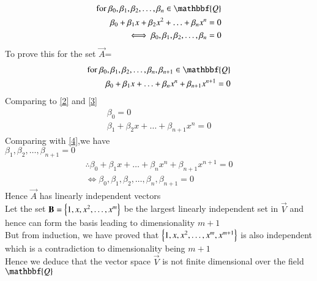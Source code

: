 \documentclass[journal,12pt,twocolumn]{IEEEtran}
\begin{document}
\begin{align}
\text{for  }\beta_0,\beta_1,\beta_2,\hdots,\beta_n \in \mathbbf{Q}\\
    \beta_0+\beta_1x+\beta_2x^2+\hdots+\beta_nx^n=0 \label{4}\\ \iff    \beta_0,\beta_1,\beta_2,\hdots,\beta_n=0
\end{align}
To prove this for the set $\vec{A}$=
\begin{align}
\text{for  }\beta_0,\beta_1,\beta_2,\hdots,\beta_n,\beta_{n+1} \in \mathbbf{Q}\\  
  \beta_0+\beta_1x+\hdots+\beta_nx^n+\beta_{n+1}x^{n+1}=0 
\end{align}
Comparing to \eqref{2} and \eqref{3}
\begin{align}
    \beta_0=0\\
    \beta_1+\beta_2x+\hdots+\beta_{n+1}x^n=0
\end{align}
Comparing with \eqref{4},we have\\
$\beta_1,\beta_2,\hdots,\beta_{n+1}=0$
\begin{align}
    \therefore  \beta_0+\beta_1x+\hdots+\beta_nx^n+\beta_{n+1}x^{n+1}=0 \\ \iff
    \beta_0,\beta_1,\beta_2,\hdots,\beta_n,\beta_{n+1}=0
\end{align}
Hence $\vec{A}$ has linearly independent vectors\\
Let the set $\mathbf{B} =\left\{1,x,x^2,\hdots,x^m\right\}$ be the largest linearly independent set in $\vec{V}$ and hence can form the basis leading to dimensionality $m+1$\\
But from induction, we have proved that $\left\{1,x,x^2,\hdots,x^m,x^{m+1}\right\}$ is also independent which is a contradiction to dimensionality being $m+1$\\
Hence we deduce that the vector space $\vec{V}$ is not finite dimensional over the field $\mathbbf{Q}$
\end{document}
